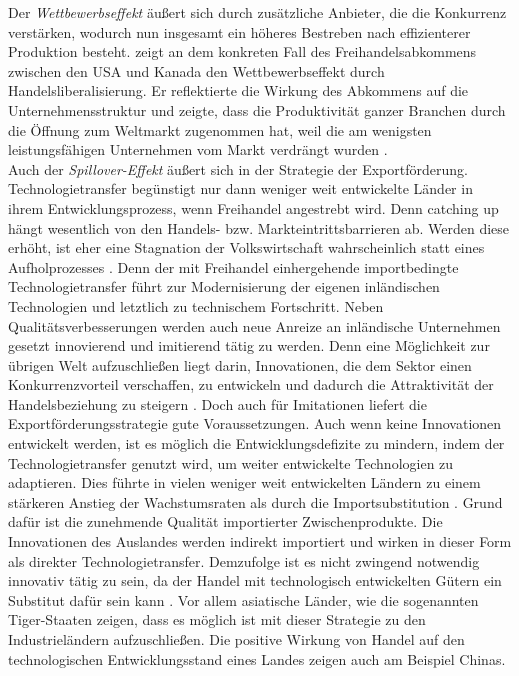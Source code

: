 Der \textit{Wettbewerbseffekt} {\"a}u{\ss}ert sich durch zus{\"a}tzliche Anbieter, die die Konkurrenz verst{\"a}rken, wodurch nun insgesamt ein h{\"o}heres Bestreben nach effizienterer Produktion besteht. \citet{Trefler.2004} zeigt an dem konkreten Fall des Freihandelsabkommens zwischen den USA und Kanada den Wettbewerbseffekt durch Handelsliberalisierung. Er reflektierte die Wirkung des Abkommens auf die Unternehmensstruktur und zeigte, dass die Produktivit{\"a}t ganzer Branchen durch die {\"O}ffnung zum Weltmarkt zugenommen hat, weil die am wenigsten leistungsf{\"a}higen Unternehmen vom Markt verdr{\"a}ngt wurden \cite{Trefler.2004}.\\
Auch der \textit{Spillover-Effekt} {\"a}u{\ss}ert sich in der Strategie der Exportf{\"o}rderung.  Technologietransfer beg{\"u}nstigt nur dann weniger weit entwickelte L{\"a}nder in ihrem Entwicklungsprozess, wenn Freihandel angestrebt wird. Denn catching up h{\"a}ngt wesentlich von den Handels- bzw. Markteintrittsbarrieren ab. Werden diese erh{\"o}ht, ist eher eine Stagnation der Volkswirtschaft wahrscheinlich statt eines Aufholprozesses \cite{Stokey.2015}. Denn der mit Freihandel einhergehende importbedingte Technologietransfer f{\"u}hrt zur Modernisierung der eigenen inl{\"a}ndischen Technologien und letztlich zu technischem Fortschritt.
Neben Qualit{\"a}tsverbesserungen werden auch neue Anreize  an inl{\"a}ndische Unternehmen gesetzt innovierend und imitierend t{\"a}tig zu werden. Denn eine M{\"o}glichkeit zur {\"u}brigen Welt aufzuschlie{\ss}en liegt darin, Innovationen, die dem Sektor einen Konkurrenzvorteil verschaffen, zu entwickeln und dadurch die Attraktivit{\"a}t der Handelsbeziehung zu steigern \citep{Muller.2005}. Doch auch f{\"u}r Imitationen liefert die Exportf{\"o}rderungsstrategie gute Voraussetzungen. Auch wenn keine Innovationen entwickelt werden, ist es m{\"o}glich die Entwicklungsdefizite zu mindern, indem der Technologietransfer genutzt wird, um weiter entwickelte Technologien zu adaptieren.
Dies f{\"u}hrte in vielen weniger weit entwickelten L{\"a}ndern zu einem st{\"a}rkeren Anstieg der Wachstumsraten als durch die Importsubstitution \cite{Krugman.2015}. Grund daf{\"u}r ist die zunehmende Qualit{\"a}t importierter Zwischenprodukte. Die Innovationen des Auslandes werden indirekt importiert und wirken in dieser Form als direkter Technologietransfer. Demzufolge ist es nicht zwingend notwendig innovativ t{\"a}tig zu sein, da der Handel mit technologisch entwickelten G{\"u}tern ein Substitut daf{\"u}r sein kann \citep{Keller.2004}. Vor allem asiatische L{\"a}nder, wie die sogenannten Tiger-Staaten zeigen, dass es m{\"o}glich ist mit dieser Strategie zu den Industriel{\"a}ndern aufzuschlie{\ss}en. Die positive Wirkung von Handel auf den technologischen Entwicklungsstand eines Landes zeigen auch \citet{Bloom.2011} am Beispiel Chinas.\\
